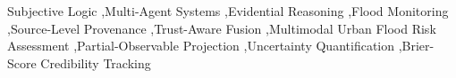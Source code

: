 \documentclass[a4paper,fleqn]{cas-dc}
\begin{document}
\begin{keywords}
Subjective Logic
\sep Multi-Agent Systems
\sep Evidential Reasoning
\sep Flood Monitoring
\sep Source-Level Provenance
\sep Trust-Aware Fusion
\sep Multimodal Urban Flood Risk Assessment
\sep Partial-Observable Projection
\sep Uncertainty Quantification
\sep Brier-Score Credibility Tracking
\end{keywords}

\maketitle












\end{document}
